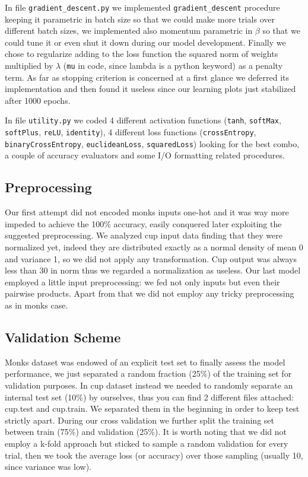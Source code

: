 In file \texttt{gradient\_descent.py} we implemented \texttt{gradient\_descent} procedure keeping it parametric in batch size so that we could make more trials over different batch sizes, we implemented also momentum parametric in $\beta$ so that we could tune it or even shut it down during our model development.
Finally we chose to regularize adding to the loss function the squared norm of weights multiplied by $\lambda$ (\texttt{mu} in code, since lambda is a python keyword) as a penalty term. As far as stopping criterion is concerned at a first glance we deferred its implementation and then found it useless since our learning plots just stabilized after 1000 epochs.

In file \texttt{utility.py} we coded 4 different activation functions (\texttt{tanh}, \texttt{softMax}, \texttt{softPlus}, \texttt{reLU}, \texttt{identity}), 4 different loss functions (\texttt{crossEntropy}, \texttt{binaryCrossEntropy}, \texttt{euclideanLoss}, \texttt{squaredLoss}) looking for the best combo, a couple of accuracy evaluators and some I/O formatting related procedures.

\subsection{Preprocessing}

Our first attempt did not encoded monks inputs one-hot and it was way more impeded to achieve the 100\% accuracy, easily conquered later exploiting the suggested preprocessing. We analyzed cup input data finding that they were normalized yet, indeed they are distributed exactly as a normal density of mean 0 and variance 1, so we did not apply any transformation. Cup output was always less than 30 in norm thus we regarded a normalization as useless. Our last model employed a little input preprocessing: we fed not only inputs but even their pairwise products. Apart from that we did not employ any tricky preprocessing as in monks case. 

\subsection{Validation Scheme}

Monks dataset was endowed of an explicit test set to finally assess the model performance, we just separated a random fraction (25\%) of the training set for validation purposes. In cup dataset instead we needed to randomly separate an internal test set (10\%) by ourselves, thus you can find 2 different files attached: cup.test and cup.train. We separated them in the beginning in order to keep test strictly apart. During our cross validation we further split the training set between train (75\%) and validation (25\%). It is worth noting that we did not employ a k-fold approach but sticked to sample a random validation for every trial, then we took the average loss (or accuracy) over those sampling (usually 10, since variance was low).


